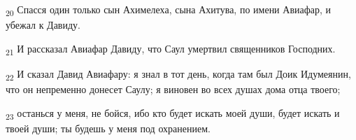 \begin{tcolorbox}
\textsubscript{20} Спасся один только сын Ахимелеха, сына Ахитува, по имени Авиафар, и убежал к Давиду.
\end{tcolorbox}
\begin{tcolorbox}
\textsubscript{21} И рассказал Авиафар Давиду, что Саул умертвил священников Господних.
\end{tcolorbox}
\begin{tcolorbox}
\textsubscript{22} И сказал Давид Авиафару: я знал в тот день, когда там был Доик Идумеянин, что он непременно донесет Саулу; я виновен во всех душах дома отца твоего;
\end{tcolorbox}
\begin{tcolorbox}
\textsubscript{23} останься у меня, не бойся, ибо кто будет искать моей души, будет искать и твоей души; ты будешь у меня под охранением.
\end{tcolorbox}
